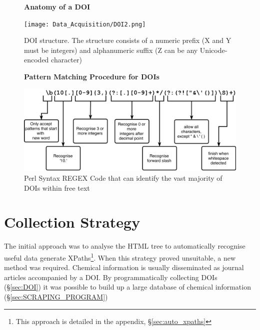 \addtocounter{page}{1}
\begin{figure}[H]
    \centering
    \textbf{Anatomy of a DOI}\par\medskip
    \texttt{[image: Data\_Acquisition/DOI2.png]}
    \caption[Anatomy of a DOI]{DOI structure. The structure consists of a numeric prefix (X and Y must be integers) and alphanumeric suffix (Z can be any Unicode-encoded character)} \label{fig:DOI}
\end{figure} 

\begin{figure}[H]
    \centering
    \textbf{Pattern Matching Procedure for DOIs}\par\medskip
    \includegraphics[width=\textwidth]{Data_Acquisition/Regex.png}
    \caption[Pattern Matching Procdure for DOIs]{Perl Syntax REGEX Code that can identify the vast majority of DOIs within free text} \label{fig:REGEX}
\end{figure}
\newpage

\section{Collection Strategy}
The initial approach was to analyse the HTML tree to automatically recognise useful data generate XPaths\footnote{This approach is detailed in the appendix, \S\ref{sec:auto_xpaths}}. When this strategy proved unsuitable, a new method was required. Chemical information is usually disseminated as journal articles accompanied by a DOI. By programmatically collecting DOIs (\S\ref{sec:DOI}) it was possible to build up a large database of chemical information (\S\ref{sec:SCRAPING_PROGRAM})

